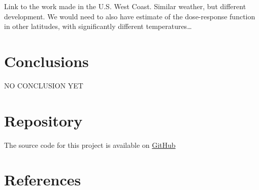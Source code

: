 Link to the work made in the U.S. West Coast. Similar weather, but
different development. We would need to also have estimate of the
dose-response function in other latitudes, with significantly different
temperatures\ldots{}

\hypertarget{conclusions}{%
\section{Conclusions}\label{conclusions}}

NO CONCLUSION YET

\hypertarget{repository}{%
\section{Repository}\label{repository}}

The source code for this project is available on
\href{https://github.com/fquezadae/Impact-of-Environmental-Variability-on-Harvest}{GitHub}

\hypertarget{references}{%
\section{References}\label{references}}
